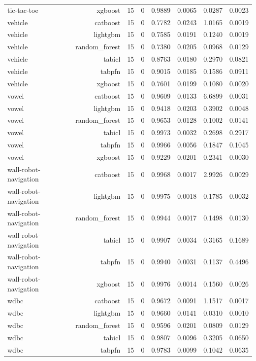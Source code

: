 \begin{table}[htbp]
\begin{tabular}{lrrrrrrr}
tic-tac-toe & xgboost & 15 & 0 & 0.9889 & 0.0065 & 0.0287 & 0.0023 \\
vehicle & catboost & 15 & 0 & 0.7782 & 0.0243 & 1.0165 & 0.0019 \\
vehicle & lightgbm & 15 & 0 & 0.7585 & 0.0191 & 0.1240 & 0.0019 \\
vehicle & random\_forest & 15 & 0 & 0.7380 & 0.0205 & 0.0968 & 0.0129 \\
vehicle & tabicl & 15 & 0 & 0.8763 & 0.0180 & 0.2970 & 0.0821 \\
vehicle & tabpfn & 15 & 0 & 0.9015 & 0.0185 & 0.1586 & 0.0911 \\
vehicle & xgboost & 15 & 0 & 0.7601 & 0.0199 & 0.1080 & 0.0020 \\
vowel & catboost & 15 & 0 & 0.9609 & 0.0133 & 6.6899 & 0.0031 \\
vowel & lightgbm & 15 & 0 & 0.9418 & 0.0203 & 0.3902 & 0.0048 \\
vowel & random\_forest & 15 & 0 & 0.9653 & 0.0128 & 0.1002 & 0.0141 \\
vowel & tabicl & 15 & 0 & 0.9973 & 0.0032 & 0.2698 & 0.2917 \\
vowel & tabpfn & 15 & 0 & 0.9966 & 0.0056 & 0.1847 & 0.1045 \\
vowel & xgboost & 15 & 0 & 0.9229 & 0.0201 & 0.2341 & 0.0030 \\
wall-robot-navigation & catboost & 15 & 0 & 0.9968 & 0.0017 & 2.9926 & 0.0029 \\
wall-robot-navigation & lightgbm & 15 & 0 & 0.9975 & 0.0018 & 0.1785 & 0.0032 \\
wall-robot-navigation & random\_forest & 15 & 0 & 0.9944 & 0.0017 & 0.1498 & 0.0130 \\
wall-robot-navigation & tabicl & 15 & 0 & 0.9907 & 0.0034 & 0.3165 & 0.1689 \\
wall-robot-navigation & tabpfn & 15 & 0 & 0.9940 & 0.0031 & 0.1137 & 0.4496 \\
wall-robot-navigation & xgboost & 15 & 0 & 0.9976 & 0.0014 & 0.1560 & 0.0026 \\
wdbc & catboost & 15 & 0 & 0.9672 & 0.0091 & 1.1517 & 0.0017 \\
wdbc & lightgbm & 15 & 0 & 0.9660 & 0.0141 & 0.0310 & 0.0010 \\
wdbc & random\_forest & 15 & 0 & 0.9596 & 0.0201 & 0.0809 & 0.0129 \\
wdbc & tabicl & 15 & 0 & 0.9807 & 0.0096 & 0.3205 & 0.0650 \\
wdbc & tabpfn & 15 & 0 & 0.9783 & 0.0099 & 0.1042 & 0.0635 \\

\end{tabular}
\end{table}
